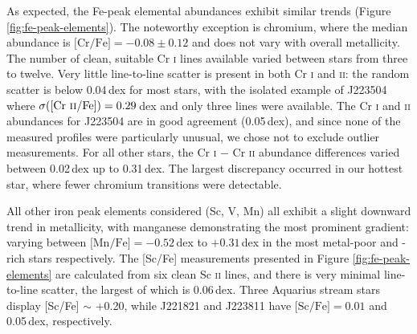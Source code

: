 \documentclass{emulateapj}
\begin{document}
As expected, the Fe-peak elemental abundances exhibit similar trends (Figure \ref{fig:fe-peak-elements}). The noteworthy exception is chromium, where the median abundance is $\mbox{[Cr/Fe]} = -0.08 \pm 0.12$ and does not vary with overall metallicity. The number of clean, suitable Cr \textsc{i} lines available varied between stars from three to twelve. Very little line-to-line scatter is present in both Cr \textsc{i} and \textsc{ii}: the random scatter is below 0.04\,dex for most stars, with the isolated example of J223504 where $\sigma(\mbox{[Cr \textsc{ii}/Fe]}) = 0.29$\,dex and only three lines were available. The Cr \textsc{i} and \textsc{ii} abundances for J223504 are in good agreement (0.05\,dex), and since none of the measured profiles were particularly unusual, we chose not to exclude outlier measurements. For all other stars, the Cr \textsc{i} $-$ Cr \textsc{ii} abundance differences varied between 0.02\,dex up to 0.31\,dex. The largest discrepancy occurred in our hottest star, where fewer chromium transitions were detectable.

All other iron peak elements considered (Sc, V, Mn) all exhibit a slight downward trend in metallicity, with manganese demonstrating the most prominent gradient: varying between $\mbox{[Mn/Fe]} = -0.52$\,dex to $+0.31$\,dex in the most metal-poor and -rich stars respectively. The [Sc/Fe] measurements presented in Figure \ref{fig:fe-peak-elements} are calculated from six clean Sc \textsc{ii} lines, and there is very minimal line-to-line scatter, the largest of which is 0.06\,dex. Three Aquarius stream stars display [Sc/Fe] $\sim$ +0.20, while J221821 and J223811 have $\mbox{[Sc/Fe]} = 0.01$ and 0.05\,dex, respectively.
\end{document}
